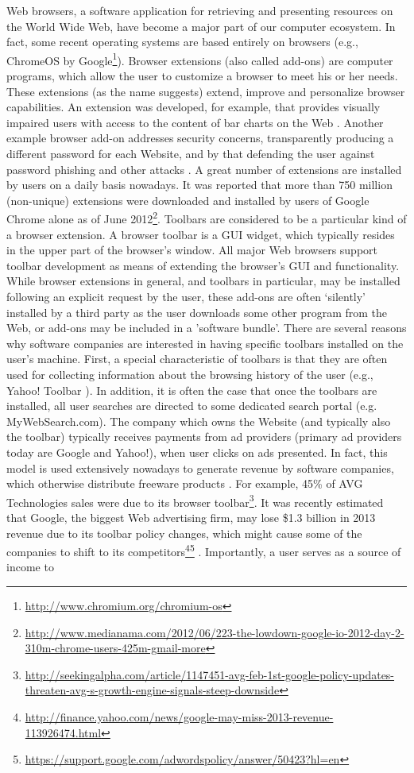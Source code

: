 \documentclass[11pt,oneside]{book}
\begin{document}
Web browsers, a software application for retrieving and presenting resources on the World Wide Web, have become a major part of our computer ecosystem. In fact, some recent operating systems are based entirely on browsers (e.g., ChromeOS by Google\footnote{\url{http://www.chromium.org/chromium-os}}). Browser extensions (also called add-ons) are computer programs, which allow the user to customize a browser to meet his or her needs. These extensions (as the name suggests) extend, improve and personalize browser capabilities. An extension was developed, for example, that provides visually impaired users with access to the content of bar charts on the Web \cite{elzer2007browser}. Another example browser add-on addresses security concerns, transparently producing a different password for each Website, and by that defending the user against password phishing and other attacks \citep{ross2005stronger}. A great number of extensions are installed by users on a daily basis nowadays. It was reported that more than 750 million (non-unique) extensions were downloaded and installed by users of Google Chrome alone as of June 2012\footnote{\url{http://www.medianama.com/2012/06/223-the-lowdown-google-io-2012-day-2-310m-chrome-users-425m-gmail-more}}.  Toolbars are considered to be a particular kind of a browser extension. A browser toolbar is a GUI widget, which typically resides in the upper part of the browser's window. All major Web browsers support toolbar development as means of extending the browser's GUI and functionality. While browser extensions in general, and toolbars in particular, may be installed following an explicit request by the user, these add-ons are often `silently' installed by a third party as the user downloads some other program from the Web, or add-ons may be included in a 'software bundle'. There are several reasons why software companies are interested in having specific toolbars installed on the user's machine. First, a special characteristic of toolbars is that they are often used for collecting information about the browsing history of the user (e.g., Yahoo! Toolbar \citep{kumar2010characterization}). In addition, it is often the case that once the toolbars are installed, all user searches are directed to some dedicated search portal (e.g. MyWebSearch.com). The company which owns the Website (and typically also the toolbar) typically receives payments from ad providers (primary ad providers today are Google and Yahoo!), when user clicks on ads presented. In fact, this model is used extensively nowadays to generate revenue by software companies, which otherwise distribute freeware products \citep{leontiadis2012don}. For example, 45\% of AVG Technologies sales were due to its browser toolbar\footnote{\url{http://seekingalpha.com/article/1147451-avg-feb-1st-google-policy-updates-threaten-avg-s-growth-engine-signals-steep-downside}}.  It was recently estimated that Google, the biggest Web advertising firm, may lose \$1.3 billion in 2013 revenue  due to its toolbar policy changes, which might cause some of the companies to shift to its competitors\footnote{\url{http://finance.yahoo.com/news/google-may-miss-2013-revenue-113926474.html}}\footnote{\url{https://support.google.com/adwordspolicy/answer/50423?hl=en}} . Importantly, a user serves as a source of income to 
\end{document}
